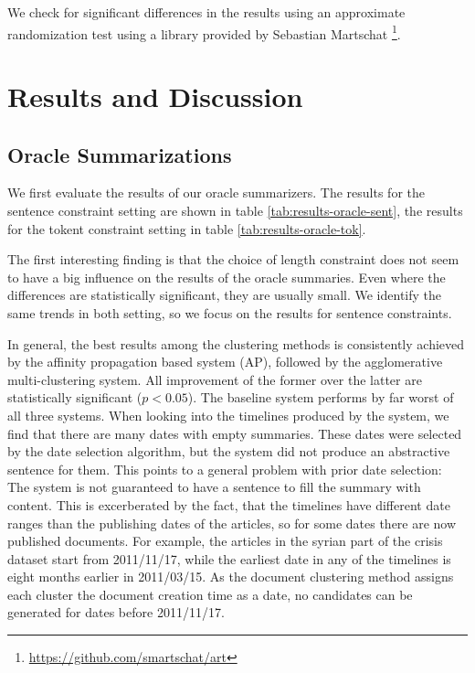 \documentclass[a4paper,BCOR=10mm]{report}
\numberwithin{lemma}{chapter}
\numberwithin{definition}{chapter}
\begin{document}
We check for significant differences in the results using an approximate randomization test \citep{art} using a library provided by Sebastian Martschat \footnote{\url{https://github.com/smartschat/art}}. %

\section{Results and Discussion}

\subsection{Oracle Summarizations}

We first evaluate the results of our oracle summarizers. The results for the sentence constraint setting are shown in table \ref{tab:results-oracle-sent}, the results for the tokent constraint setting in table \ref{tab:results-oracle-tok}.

The first interesting finding is that the choice of length constraint does not seem to have a big influence on the results of the oracle summaries. Even where the differences are statistically significant, they are usually small.
We identify the same trends in both setting, so we focus on the results for sentence constraints.

In general, the best results among the clustering methods is consistently achieved by the affinity propagation based system (AP), followed by the agglomerative multi-clustering system. All improvement of the former over the latter are statistically significant ($p < 0.05$). The baseline system performs by far worst of all three systems. When looking into the timelines produced by the system, we find that there are many dates with empty summaries. These dates were selected by the date selection algorithm, but the system did not produce an abstractive sentence for them. This points to a general problem with prior date selection: The system is not guaranteed to have a sentence to fill the summary with content. This is excerberated by the fact, that the timelines have different date ranges than the publishing dates of the articles, so for some dates there are now published documents. For example, the articles in the syrian part of the crisis dataset start from 2011/11/17, while the earliest date in any of the timelines is eight months earlier in 2011/03/15. As the document clustering method assigns each cluster the document creation time as a date, no candidates can be generated for dates before 2011/11/17.
\end{document}
